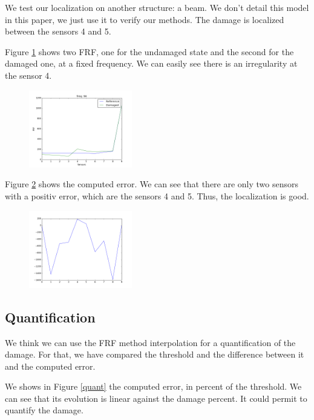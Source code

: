 \documentclass[journal]{IEEEtran}
\begin{document}
We test our localization on another structure: a beam. We don't detail this model in this paper, we just use it to verify our methods. The damage is localized between the sensors 4 and 5.

Figure \ref{beam_curve} shows two FRF, one for the undamaged state and the second for the damaged one, at a fixed frequency. We can easily see there is an irregularity at the sensor 4.

\begin{figure}[h!]
  \centering
  \includegraphics[width=0.4\textwidth]{images/poutre_curve2.png}
  \caption{}
  \label{beam_curve}
\end{figure}


Figure \ref{beam_error} shows the computed error. We can see that there are only two sensors with a positiv error, which are the sensors 4 and 5. Thus, the localization is good.

\begin{figure}[h!]
  \centering
  \includegraphics[width=0.4\textwidth]{images/poutre_error.png}
  \caption{}
  \label{beam_error}
\end{figure}



\subsection{Quantification}

We think we can use the FRF method interpolation for a quantification of the damage. For that, we have compared the threshold and the difference between it and the computed error.

We shows in Figure \ref{quant} the computed error, in percent of the threshold. We can see that its evolution is linear against the damage percent.
It could permit to quantify the damage.
\end{document}

